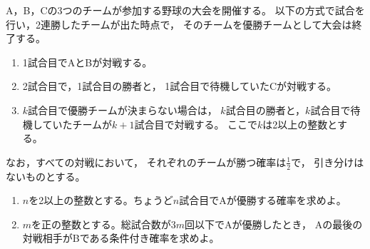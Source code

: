 \documentclass[../../main.tex]{subfiles}
\begin{document}
A，B，Cの3つのチームが参加する野球の大会を開催する。
以下の方式で試合を行い，2連勝したチームが出た時点で，
そのチームを優勝チームとして大会は終了する。
\begin{enumerate}
  \item1試合目でAとBが対戦する。
  \item2試合目で，1試合目の勝者と，
    1試合目で待機していたCが対戦する。
  \item$k$試合目で優勝チームが決まらない場合は，
    $k$試合目の勝者と，$k$試合目で待機していたチームが$k+1$試合目で対戦する。
    ここで$k$は2以上の整数とする。
\end{enumerate}
なお，すべての対戦において，
それぞれのチームが勝つ確率は$\displaystyle\frac{1}{2}$で，
引き分けはないものとする。
\begin{enumerate}
  \item$n$を2以上の整数とする。ちょうど$n$試合目でAが優勝する確率を求めよ。
  \item$m$を正の整数とする。総試合数が$3m$回以下でAが優勝したとき，
    Aの最後の対戦相手がBである条件付き確率を求めよ。
\end{enumerate}
\end{document}
